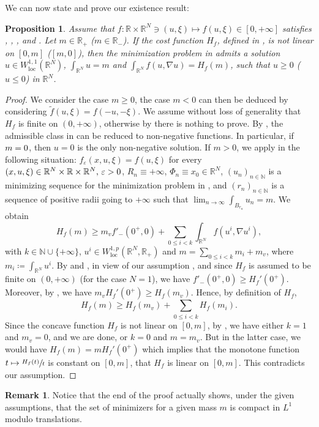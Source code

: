 \documentclass[10pt]{amsart}
\theoremstyle{plain}
\newtheorem{proposition}[theorem]{Proposition}
\theoremstyle{definition}
\newtheorem{remark}[theorem]{Remark}
\newcommand{\N}{\mathbb{N}}
\newcommand{\R}{\mathbb{R}}
\newcommand{\loc}{\mathrm{loc}}
\newcommand{\eps}{\varepsilon}
\begin{document}
We can now state and prove our existence result:
\begin{proposition}\label{existenceProfile}
Assume that $f:\R \times \R^N \ni (u,\xi) \mapsto f(u,\xi)\in [0,+\infty]$ satisfies , , ,  and . Let \(m\in \R_+\) (\resp \(m\in \R_-\)). If the cost function $H_f$, defined in , is not linear on \([0,m]\) (\resp $[m,0]$), then the minimization problem in  admits a solution \(u\in W^{1,1}_\loc(\R^N)\), \ie \(\int_{\R^N} u = m\) and \(\int_{\R^N}f(u,\nabla u)=H_f(m)\), such that $u\geq 0$ (\resp $u\leq 0$) in $\R^N$.
\end{proposition}
\begin{proof}
We consider the case $m\geq 0$, the case $m<0$ can then be deduced by considering $\tilde{f}(u,\xi)=f(-u,-\xi)$. We assume without loss of generality that $H_f$ is finite on $(0,+\infty)$, otherwise by  there is nothing to prove. By , the admissible class in  can be reduced to non-negative functions. In particular, if~\(m=\nobreak0\), then \(u=0\) is the only non-negative solution. If \(m>0\), we apply  in the following situation: \(f_\eps(x,u,\xi)=f(u,\xi)\) for every \((x,u,\xi)\in\R^N\times\R\times\R^N$, $\varepsilon>0\), \(R_n\equiv +\infty\), \(\Phi_n\equiv x_0\in\R^N\), \((u_n)_{n\in\N}\) is a minimizing sequence for the minimization problem in , and \((r_n)_{n\in\N}\) is a sequence of positive radii going to \(+\infty\) such that \(\lim_{n\to\infty}\int_{B_{r_n}}u_n=m\). We obtain
\[
H_f(m)\geq m_v f'_-(0^+,0)+\sum_{0\leq i<k}\int_{\R^N}f(u^i,\nabla u^i),
\]
with \(k\in\N\cup\{+\infty\}\), \(u^i\in W^{1,p}_\loc(\R^N,\R_+)\) and \(m=\sum_{0\leq i<k}m_i+m_v\), where \(m_i\coloneqq\int_{\R^N}u^i\). By  and , in view of our assumption , and since $H_f$ is assumed to be finite on $(0,+\infty)$ (for the case $N=1$), we have \(f'_-(0^+,0)\geq H_f'(0^+)\). Moreover, by , we have \(m_v H_f'(0^+)\geq H_f(m_v)\). Hence, by definition of \(H_f\),
\[
H_f(m)\geq H_f(m_v)+\sum_{0\leq i<k}H_f(m_i).
\]
Since the concave function \(H_f\) is not linear on \([0,m]\), by , we have either \(k=1\) and \(m_v=0\), and we are done, or \(k=0\) and \(m=m_v\). But in the latter case, we would have \(H_f(m)=mH_f'(0^+)\) which implies that the monotone function \(t\mapsto \sfrac{H_f(t)}{t}\) is constant on \([0,m]\), \ie that \(H_f\) is linear on \([0,m]\). This contradicts our assumption.
\end{proof}
\begin{remark}\label{compact_modulo}
Notice that the end of the proof actually shows, under the given assumptions, that the set of minimizers for a given mass $m$ is compact in $L^1$ modulo translations.
\end{remark}
\end{document}

